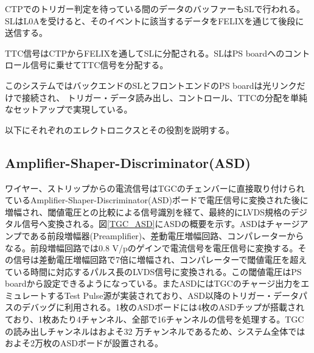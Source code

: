 CTPでのトリガー判定を待っている間のデータのバッファーもSLで行われる。SLはL0Aを受けると、そのイベントに該当するデータをFELIXを通じて後段に送信する。

TTC信号はCTPからFELIXを通してSLに分配される。SLはPS boardへのコントロール信号に乗せてTTC信号を分配する。

このシステムではバックエンドのSLとフロントエンドのPS boardは光リンクだけで接続され、
トリガー・データ読み出し、コントロール、TTCの分配を単純なセットアップで実現している。

以下にそれぞれのエレクトロニクスとその役割を説明する。

    \subsection*{Amplifier-Shaper-Discriminator(ASD)}
ワイヤー、ストリップからの電流信号はTGCのチェンバーに直接取り付けられているAmplifier-Shaper-Discriminator(ASD)ボードで電圧信号に変換された後に増幅され、閾値電圧との比較による信号識別を経て、最終的にLVDS規格のデジタル信号へ変換される。図\ref{TGC_ASD}にASDの概要を示す。ASDはチャージアンプである前段増幅器(Preamplifier)、差動電圧増幅回路、コンパレーターからなる。前段増幅回路では0.8 V/pのゲインで電流信号を電圧信号に変換する。その信号は差動電圧増幅回路で7倍に増幅され、コンパレーターで閾値電圧を超えている時間に対応するパルス長のLVDS信号に変換される。この閾値電圧はPS boardから設定できるようになっている。またASDにはTGCのチャージ出力をエミュレートするTest Pulse源が実装されており、ASD以降のトリガー・データパスのデバッグに利用される。1枚のASDボードには4枚のASDチップが搭載されており、1枚あたり4チャンネル、全部で16チャンネルの信号を処理する。TGCの読み出しチャンネルはおよそ32 万チャンネルであるため、システム全体ではおよそ2万枚のASDボードが設置される。

